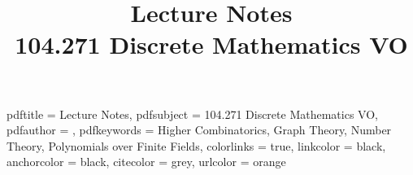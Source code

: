 


\usepackage[english]{babel}
\usepackage[utf8x]{inputenc}
\usepackage[T1]{fontenc}
\usepackage{calc}
\usepackage{lmodern}
\usepackage{pifont}
\usepackage[final]{graphicx}
\usepackage{subfigure}
\usepackage[intlimits]{mathtools}
\usepackage{amssymb}
\usepackage{booktabs}
\usepackage{float}
\usepackage{framed}
\usepackage{cleveref}
\usepackage{tabularx}
\usepackage{caption}
\usepackage{ragged2e}
\usepackage{soul}
\usepackage{theorem}
\usepackage{tikz}
\usepackage{makeidx}
\usepackage{paralist}
\usepackage[iso,german,english]{isodate}
\usepackage{placeins}
\usepackage[pdfborder={0 0 0}]{hyperref}







\newcommand{\Title}{Lecture Notes}
\newcommand{\Subject}{104.271 Discrete Mathematics VO}
\newcommand{\Keywords}{Higher Combinatorics, Graph Theory, Number Theory, Polynomials over Finite Fields}


\hypersetup
{
  pdftitle    = {\Title},
  pdfsubject  = {\Subject},
  pdfauthor   = {},
  pdfkeywords = {\Keywords},
  colorlinks  = true,
  linkcolor   = black,
  anchorcolor = black,
  citecolor   = grey,
  urlcolor    = orange
}

\makeatletter

\captionsetup{format=hang,justification=justified,labelfont=bf,labelsep=colon,font=small}
\long{}

\author{}
\title{\Title\\ \Subject}
\def\@thanks{%
  \vfill%
  \textbf{Collaborate!} This document is edited collaboratively. We take notes
  during the lecture using EtherPad, and maintain them afterwards using Git.
  Join us! \mbox{\href
    {http://www.informatik-forum.at/showthread.php?104454-Notes-2013WS-VO_01&p=809709&viewfull=1\#post809709}
    {\nolinkurl{http://informatik-forum.at/showthread.php?104454-Notes-2013WS}}}
}

\makeindex
\gdef\th@custom{%
  \th@plain%
  \def\@begintheorem##1##2{%
    \item[\hskip\labelsep \theorem@headerfont ##1\ ##2.]}}%
\theoremstyle{custom}
\theorembodyfont{\normalfont}
\newtheorem{definition}{Definition}

\def\thechapter{\Roman{chapter}}

